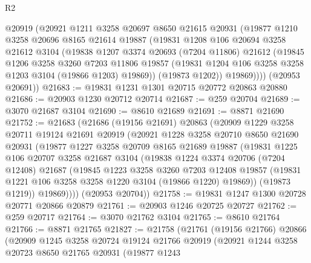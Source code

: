 \begin{lexlean}{R2}
\begin{coremodule}
        @20919
        (@20921
          @1211
          @3258
          @20697
          @8650
          @21615
          @20931
          (@19877
            @1210
            @3258
            @20696
            @8165
            @21614
            @19887
            (@19831
              @1208
              @106
              @20694
              @3258
              @21612
              @3104
              (@19838
                @1207
                @3374
                @20693
                (@7204 @11806)
                @21612
                (@19845
                  @1206
                  @3258
                  @3260
                  @7203
                  @11806
                  @19857
                  (@19831 @1204 @106 @3258 @3258 @1203 @3104 (@19866 @1203) @19869))
                (@19873 @1202))
              @19869))))
      (@20953 @20691))
@21683 := @19831 @1231 @1301 @20715 @20772 @20863 @20880
@21686 := @20903 @1230 @20712 @20714
@21687 := @259 @20704
@21689 := @3070 @21687 @3104
@21690 := @8610 @21689
@21691 := @8871 @21690
@21752 := @21683
    (@21686
      (@19156 @21691)
      @20863
      (@20909
        @1229
        @3258
        @20711
        @19124
        @21691
        @20919
        (@20921
          @1228
          @3258
          @20710
          @8650
          @21690
          @20931
          (@19877
            @1227
            @3258
            @20709
            @8165
            @21689
            @19887
            (@19831
              @1225
              @106
              @20707
              @3258
              @21687
              @3104
              (@19838
                @1224
                @3374
                @20706
                (@7204 @12408)
                @21687
                (@19845
                  @1223
                  @3258
                  @3260
                  @7203
                  @12408
                  @19857
                  (@19831 @1221 @106 @3258 @3258 @1220 @3104 (@19866 @1220) @19869))
                (@19873 @1219))
              @19869))))
      (@20953 @20704))
@21758 := @19831 @1247 @1300 @20728 @20771 @20866 @20879
@21761 := @20903 @1246 @20725 @20727
@21762 := @259 @20717
@21764 := @3070 @21762 @3104
@21765 := @8610 @21764
@21766 := @8871 @21765
@21827 := @21758
    (@21761
      (@19156 @21766)
      @20866
      (@20909
        @1245
        @3258
        @20724
        @19124
        @21766
        @20919
        (@20921
          @1244
          @3258
          @20723
          @8650
          @21765
          @20931
          (@19877
            @1243

\end{coremodule}
\end{lexlean}
